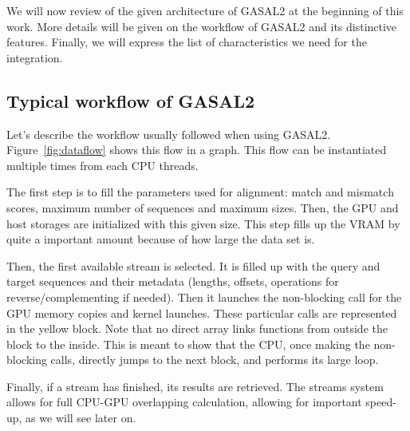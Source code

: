 We will now review of the given architecture of GASAL2 at the beginning of this work. More details will be given on the workflow of GASAL2 and its distinctive features. Finally, we will express the list of characteristics we need for the integration.


\subsection{Typical workflow of GASAL2}

Let's describe the workflow usually followed when using GASAL2. Figure~\ref{fig:dataflow} shows this flow in a graph. This flow can be instantiated multiple times from each CPU threads.

The first step is to fill the parameters used for alignment: match and mismatch scores, maximum number of sequences and maximum sizes. Then, the GPU and host storages are initialized with this given size. This step fills up the VRAM by quite a important amount because of how large the data set is. 

Then, the first available stream is selected. It is filled up with the query and target sequences and their metadata (lengths, offsets, operations for reverse/complementing if needed). Then it launches the non-blocking call for the GPU memory copies and kernel launches. These particular calls are represented in the yellow block. Note that no direct array links functions from outside the block to the inside. This is meant to show that the CPU, once making the non-blocking calls, directly jumps to the next block, and performs its large loop.

Finally, if a stream has finished, its results are retrieved. The streams system allows for full CPU-GPU overlapping calculation, allowing for important speed-up, as we will see later on.

